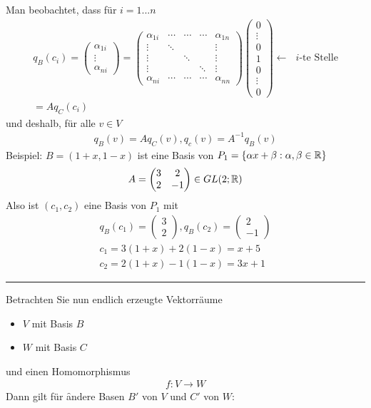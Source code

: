 Man beobachtet, dass für $i = 1...n$ 
\begin{align}
q_B (c_i) = 
\begin{pmatrix}
\alpha_{1i} \\ \vdots \\ \alpha_{ni}
\end{pmatrix}
=
\begin{pmatrix}
\alpha_{1i} & \cdots & \cdots & \cdots & \alpha_{1n} \\ 
\vdots & \ddots &  & & \vdots \\ 
\vdots & & \ddots & & \vdots \\ 
\vdots & & & \ddots & \vdots \\ 
\alpha_{ni} & \cdots & \cdots & \cdots & \alpha_{nn}
\end{pmatrix}
\begin{pmatrix}
0 \\ \vdots \\ 0 \\ 1 \\ 0 \\ \vdots \\ 0
\end{pmatrix}
\leftarrow \text{ $i$-te Stelle} \\
= A q_C (c_i)
\end{align}
und deshalb, für alle $v \in V$
\begin{align}
q_B (v) = A q_C(v), q_c(v) = A^{-1} q_B (v)
\end{align}
Beispiel: $B = (1 + x, 1 - x)$ ist eine Basis von $P_1 = \{\alpha x + \beta: \alpha, \beta \in \mathbb{R}\}$
\begin{align}
A =
\begin{pmatrix}
3 & 2 \\ 2 & -1
\end{pmatrix}
\in GL(2; \mathbb{R})
\end{align}
Also ist $(c_1, c_2)$ eine Basis von $P_1$ mit
\begin{align}
q_B (c_1) = \begin{pmatrix} 3 \\ 2 \end{pmatrix}, q_B (c_2) = \begin{pmatrix} 2 \\ -1 \end{pmatrix} \\
c_1 = 3(1+x) + 2(1-x) = x+ 5 \\
c_2 = 2(1 + x) - 1 (1-x) = 3x + 1
\end{align}
\vspace*{0.2cm}\rule{\linewidth}{0.3mm}\vspace{0.2cm}
Betrachten Sie nun endlich erzeugte Vektorräume
\begin{itemize}
 \item $V$ mit Basis $B$
 \item $W$ mit Basis $C$
\end{itemize}
und einen Homomorphismus
\begin{align}
f: V \rightarrow W
\end{align}
Dann gilt für \f{andere Basen} $B'$ von $V$ und $C'$ von $W$:

